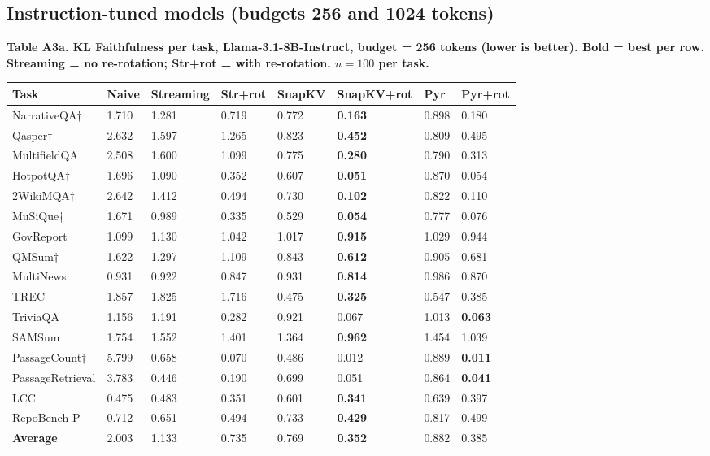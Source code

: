 \documentclass[10pt,letterpaper]{article}
\begin{document}
\subsection*{Instruction-tuned models (budgets 256 and 1024 tokens)}


\textbf{Table A3a. KL Faithfulness per task, Llama-3.1-8B-Instruct,
budget = 256 tokens (lower is better). Bold = best per row.
Streaming = no re-rotation; Str+rot = with re-rotation.
$n = 100$ per task.}

\nopagebreak
\begin{table}[H]
\centering
\small
\begin{tabular}{@{}llllllll@{}}
\toprule
Task & Naive & Streaming & Str+rot & SnapKV & SnapKV+rot & Pyr &
Pyr+rot\\
\midrule
NarrativeQA† & 1.710 & 1.281 & 0.719 & 0.772 & \textbf{0.163} & 0.898 &
0.180\\
Qasper† & 2.632 & 1.597 & 1.265 & 0.823 & \textbf{0.452} & 0.809 &
0.495\\
MultifieldQA & 2.508 & 1.600 & 1.099 & 0.775 & \textbf{0.280} & 0.790 &
0.313\\
HotpotQA† & 1.696 & 1.090 & 0.352 & 0.607 & \textbf{0.051} & 0.870 &
0.054\\
2WikiMQA† & 2.642 & 1.412 & 0.494 & 0.730 & \textbf{0.102} & 0.822 &
0.110\\
MuSiQue† & 1.671 & 0.989 & 0.335 & 0.529 & \textbf{0.054} & 0.777 &
0.076\\
GovReport & 1.099 & 1.130 & 1.042 & 1.017 & \textbf{0.915} & 1.029 &
0.944\\
QMSum† & 1.622 & 1.297 & 1.109 & 0.843 & \textbf{0.612} & 0.905 &
0.681\\
MultiNews & 0.931 & 0.922 & 0.847 & 0.931 & \textbf{0.814} & 0.986 &
0.870\\
TREC & 1.857 & 1.825 & 1.716 & 0.475 & \textbf{0.325} & 0.547 &
0.385\\
TriviaQA & 1.156 & 1.191 & 0.282 & 0.921 & 0.067 & 1.013 &
\textbf{0.063}\\
SAMSum & 1.754 & 1.552 & 1.401 & 1.364 & \textbf{0.962} & 1.454 &
1.039\\
PassageCount† & 5.799 & 0.658 & 0.070 & 0.486 & 0.012 & 0.889 &
\textbf{0.011}\\
PassageRetrieval & 3.783 & 0.446 & 0.190 & 0.699 & 0.051 & 0.864 &
\textbf{0.041}\\
LCC & 0.475 & 0.483 & 0.351 & 0.601 & \textbf{0.341} & 0.639 &
0.397\\
RepoBench-P & 0.712 & 0.651 & 0.494 & 0.733 & \textbf{0.429} & 0.817 &
0.499\\
\textbf{Average} & 2.003 & 1.133 & 0.735 & 0.769 & \textbf{0.352} & 0.882 &
0.385\\
\bottomrule
\end{tabular}
\end{table}
\end{document}
